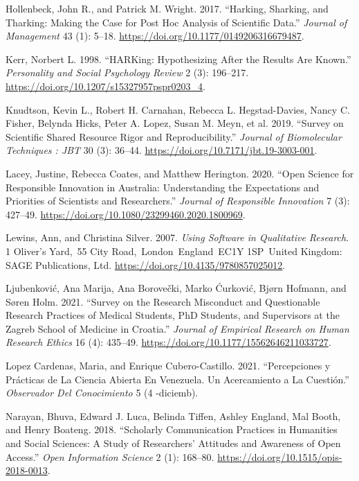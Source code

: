 \documentclass[
  english,
  letterpaper,
]{article}
\newlength{\cslhangindent}
\newenvironment{CSLReferences}[2] %
 {\begin{list}{}{%
  \setlength{\itemindent}{0pt}
  \setlength{\leftmargin}{0pt}
  \setlength{\parsep}{0pt}
  \ifodd #1
   \setlength{\leftmargin}{\cslhangindent}
   \setlength{\itemindent}{-1\cslhangindent}
  \fi
  \setlength{\itemsep}{#2\baselineskip}}}
 {\end{list}}
\begin{document}
\begin{CSLReferences}{1}{0}
Hollenbeck, John R., and Patrick M. Wright. 2017. {``Harking,
{Sharking}, and {Tharking}: {Making} the {Case} for {Post Hoc Analysis}
of {Scientific Data}.''} \emph{Journal of Management} 43 (1): 5--18.
\url{https://doi.org/10.1177/0149206316679487}.

Kerr, Norbert L. 1998. {``{HARKing}: {Hypothesizing After} the {Results}
Are {Known}.''} \emph{Personality and Social Psychology Review} 2 (3):
196--217. \url{https://doi.org/10.1207/s15327957pspr0203_4}.

Knudtson, Kevin L., Robert H. Carnahan, Rebecca L. Hegstad-Davies, Nancy
C. Fisher, Belynda Hicks, Peter A. Lopez, Susan M. Meyn, et al. 2019.
{``Survey on {Scientific Shared Resource Rigor} and
{Reproducibility}.''} \emph{Journal of Biomolecular Techniques : JBT} 30
(3): 36--44. \url{https://doi.org/10.7171/jbt.19-3003-001}.

Lacey, Justine, Rebecca Coates, and Matthew Herington. 2020. {``Open
Science for Responsible Innovation in {Australia}: {Understanding} the
Expectations and Priorities of Scientists and Researchers.''}
\emph{Journal of Responsible Innovation} 7 (3): 427--49.
\url{https://doi.org/10.1080/23299460.2020.1800969}.

Lewins, Ann, and Christina Silver. 2007. \emph{Using {Software} in
{Qualitative Research}}. 1 Oliver's Yard,~55 City
Road,~London~England~EC1Y 1SP~United Kingdom: SAGE Publications, Ltd.
\url{https://doi.org/10.4135/9780857025012}.

Ljubenković, Ana Marija, Ana Borovečki, Marko Ćurković, Bjørn Hofmann,
and Søren Holm. 2021. {``Survey on the {Research Misconduct} and
{Questionable Research Practices} of {Medical Students}, {PhD Students},
and {Supervisors} at the {Zagreb School} of {Medicine} in {Croatia}.''}
\emph{Journal of Empirical Research on Human Research Ethics} 16 (4):
435--49. \url{https://doi.org/10.1177/15562646211033727}.

Lopez Cardenas, Maria, and Enrique Cubero-Castillo. 2021.
{``Percepciones y Pr{á}cticas de La Ciencia Abierta En {Venezuela}. {Un}
Acercamiento a La Cuesti{ó}n.''} \emph{Observador Del Conocimiento} 5 (4
-diciemb).

Narayan, Bhuva, Edward J. Luca, Belinda Tiffen, Ashley England, Mal
Booth, and Henry Boateng. 2018. {``Scholarly {Communication Practices}
in {Humanities} and {Social Sciences}: {A Study} of {Researchers}'
{Attitudes} and {Awareness} of {Open Access}.''} \emph{Open Information
Science} 2 (1): 168--80. \url{https://doi.org/10.1515/opis-2018-0013}.


\end{CSLReferences}
\end{document}
